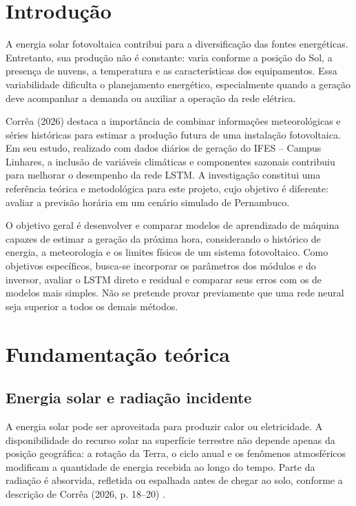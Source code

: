 \section{Introdução}
A energia solar fotovoltaica contribui para a diversificação das fontes energéticas. Entretanto, sua produção não é constante: varia conforme a posição do Sol, a presença de nuvens, a temperatura e as características dos equipamentos. Essa variabilidade dificulta o planejamento energético, especialmente quando a geração deve acompanhar a demanda ou auxiliar a operação da rede elétrica.

Corrêa (2026) \cite{correa} destaca a importância de combinar informações meteorológicas e séries históricas para estimar a produção futura de uma instalação fotovoltaica. Em seu estudo, realizado com dados diários de geração do IFES -- Campus Linhares, a inclusão de variáveis climáticas e componentes sazonais contribuiu para melhorar o desempenho da rede LSTM. A investigação constitui uma referência teórica e metodológica para este projeto, cujo objetivo é diferente: avaliar a previsão horária em um cenário simulado de Pernambuco.

O objetivo geral é desenvolver e comparar modelos de aprendizado de máquina capazes de estimar a geração da próxima hora, considerando o histórico de energia, a meteorologia e os limites físicos de um sistema fotovoltaico. Como objetivos específicos, busca-se incorporar os parâmetros dos módulos e do inversor, avaliar o LSTM direto e residual e comparar seus erros com os de modelos mais simples. Não se pretende provar previamente que uma rede neural seja superior a todos os demais métodos.

\section{Fundamentação teórica}
\subsection{Energia solar e radiação incidente}
A energia solar pode ser aproveitada para produzir calor ou eletricidade. A disponibilidade do recurso solar na superfície terrestre não depende apenas da posição geográfica: a rotação da Terra, o ciclo anual e os fenômenos atmosféricos modificam a quantidade de energia recebida ao longo do tempo. Parte da radiação é absorvida, refletida ou espalhada antes de chegar ao solo, conforme a descrição de Corrêa (2026, p. 18--20) \cite{correa}.

